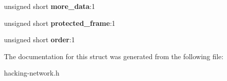 \begin{DoxyCompactItemize}
\item 
unsigned short {\bfseries more\+\_\+data}\+:1\hypertarget{structframe__control_adb5ce701741169ba4fa77df68a69b065}{}\label{structframe__control_adb5ce701741169ba4fa77df68a69b065}

\item 
unsigned short {\bfseries protected\+\_\+frame}\+:1\hypertarget{structframe__control_ac75f11025ccedefde9276f821cdc8942}{}\label{structframe__control_ac75f11025ccedefde9276f821cdc8942}

\item 
unsigned short {\bfseries order}\+:1\hypertarget{structframe__control_a7d79b0e2031f96da1573d09b4c60447f}{}\label{structframe__control_a7d79b0e2031f96da1573d09b4c60447f}

\end{DoxyCompactItemize}


The documentation for this struct was generated from the following file\+:\begin{DoxyCompactItemize}
\item 
hacking-\/network.\+h\end{DoxyCompactItemize}
